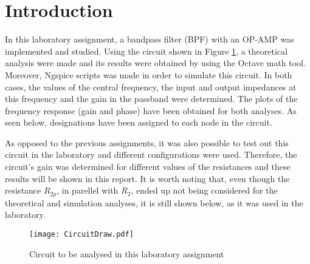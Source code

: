 \section{Introduction} \label{sec:introduction}

In this laboratory assignment, a bandpass filter (BPF) with an OP-AMP was implemented and studied. Using the circuit shown in Figure \ref{fig:CircuitDraw}, a theoretical analysis were made and its results were obtained by using the Octave math tool. Moreover, Ngspice scripts was made in order to simulate this circuit. In both cases, the values of the central frequency, the input and output impedances at this frequency and the gain in the passband were determined. The plots of the frequency response (gain and phase) have been obtained for both analyses. As seen below, designations have been assigned to each node in the circuit.
\par
As opposed to the previous assignments, it was also possible to test out this circuit in the laboratory and different configurations were used. Therefore, the circuit's gain was determined for different values of the resistances and these results will be shown in this report. It is worth noting that, even though the resistance $R_{2p}$, in parellel with $R_2$, ended up not being considered for the theoretical and simulation analyses, it is still shown below, as it was used in the laboratory.

\begin{figure}[H] \centering
  \texttt{[image: CircuitDraw.pdf]}
  \caption{Circuit to be analysed in this laboratory assignment}
  \label{fig:CircuitDraw}
\end{figure}
